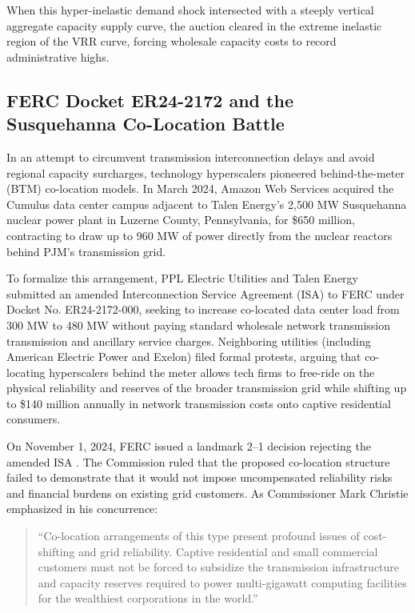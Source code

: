\documentclass[11pt,a4paper]{article}
\begin{document}
When this hyper-inelastic demand shock intersected with a steeply vertical aggregate capacity supply curve, the auction cleared in the extreme inelastic region of the VRR curve, forcing wholesale capacity costs to record administrative highs.

\subsection{FERC Docket ER24-2172 and the Susquehanna Co-Location Battle}

In an attempt to circumvent transmission interconnection delays and avoid regional capacity surcharges, technology hyperscalers pioneered behind-the-meter (BTM) co-location models. In March 2024, Amazon Web Services acquired the Cumulus data center campus adjacent to Talen Energy's 2,500 MW Susquehanna nuclear power plant in Luzerne County, Pennsylvania, for \$650 million, contracting to draw up to 960 MW of power directly from the nuclear reactors behind PJM's transmission grid.

To formalize this arrangement, PPL Electric Utilities and Talen Energy submitted an amended Interconnection Service Agreement (ISA) to FERC under Docket No. ER24-2172-000, seeking to increase co-located data center load from 300 MW to 480 MW without paying standard wholesale network transmission transmission and ancillary service charges. Neighboring utilities (including American Electric Power and Exelon) filed formal protests, arguing that co-locating hyperscalers behind the meter allows tech firms to free-ride on the physical reliability and reserves of the broader transmission grid while shifting up to \$140 million annually in network transmission costs onto captive residential consumers.

On November 1, 2024, FERC issued a landmark 2--1 decision rejecting the amended ISA \citep{ferc2024susquehanna}. The Commission ruled that the proposed co-location structure failed to demonstrate that it would not impose uncompensated reliability risks and financial burdens on existing grid customers. As Commissioner Mark Christie emphasized in his concurrence:
\begin{quote}
``Co-location arrangements of this type present profound issues of cost-shifting and grid reliability. Captive residential and small commercial customers must not be forced to subsidize the transmission infrastructure and capacity reserves required to power multi-gigawatt computing facilities for the wealthiest corporations in the world.''
\end{quote}
\end{document}
